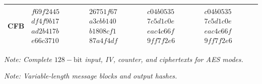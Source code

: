 \begin{table}[!t]
{\begin{tabular}{l|>{\raggedright\arraybackslash}p{2.2cm}|>{\raggedright\arraybackslash}p{2.2cm}|>{\raggedright\arraybackslash}p{2.4cm}|>{\raggedright\arraybackslash}p{2.4cm}}
\midrule
\textbf{CFB} & \texttt{$f69f2445$ \newline $df4f9b17$ \newline $ad2b417b$ \newline $e66c3710$} & \texttt{$26751f67$ \newline $a3cbb140$ \newline $b1808cf1$ \newline $87a4f4df$} & \texttt{$c04b0535$ \newline $7c5d1c0e$ \newline $eac4c66f$ \newline $9ff7f2e6$} & \texttt{$c04b0535$ \newline $7c5d1c0e$ \newline $eac4c66f$ \newline $9ff7f2e6$} \\
\bottomrule
\end{tabular}%
}
\vspace{2pt}
\raggedright
\footnotesize\textit{Note: Complete $128-\text{bit}$ input, IV, counter, and ciphertexts for AES modes.}
\end{table}

\begin{table}[!t]
\centering
\caption{Functional Verification Vectors for $\text{SHA}3\text{-}256$}
\label{tab:sha3_functional_full}
\small
{}
\vspace{2pt}
\raggedright
\footnotesize\textit{Note: Variable-length message blocks and output hashes.}
\end{table}

